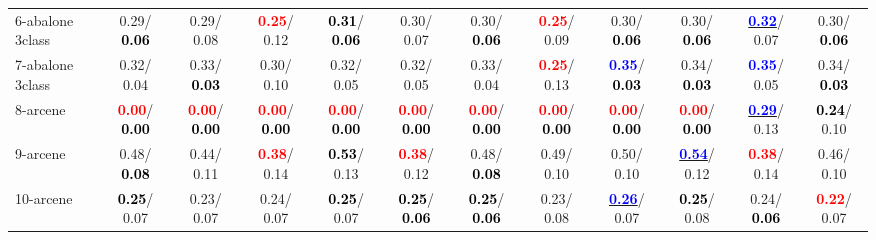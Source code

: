 \begin{table}[h]
\begin{center}
{\begin{tabular}{lc|c|c|c|c|c|c|c|c|c|c}
6-abalone 3class &   0.29/\textcolor{black}{\textbf{  0.06}} &   0.29/  0.08 & \textcolor{red}{\textbf{  0.25}}/  0.12 & \textcolor{black}{\textbf{  0.31}}/\textcolor{black}{\textbf{  0.06}} &   0.30/  0.07 &   0.30/\textcolor{black}{\textbf{  0.06}} & \textcolor{red}{\textbf{  0.25}}/  0.09 &   0.30/\textcolor{black}{\textbf{  0.06}} &   0.30/\textcolor{black}{\textbf{  0.06}} & \underline{\textcolor{blue}{\textbf{  0.32}}}/  0.07 &   0.30/\textcolor{black}{\textbf{  0.06}} \\
7-abalone 3class &   0.32/  0.04 &   0.33/\textcolor{black}{\textbf{  0.03}} &   0.30/  0.10 &   0.32/  0.05 &   0.32/  0.05 &   0.33/  0.04 & \textcolor{red}{\textbf{  0.25}}/  0.13 & \textcolor{blue}{\textbf{  0.35}}/\textcolor{black}{\textbf{  0.03}} &   0.34/\textcolor{black}{\textbf{  0.03}} & \textcolor{blue}{\textbf{  0.35}}/  0.05 &   0.34/\textcolor{black}{\textbf{  0.03}} \\ \hline
8-arcene & \textcolor{red}{\textbf{  0.00}}/\textcolor{black}{\textbf{  0.00}} & \textcolor{red}{\textbf{  0.00}}/\textcolor{black}{\textbf{  0.00}} & \textcolor{red}{\textbf{  0.00}}/\textcolor{black}{\textbf{  0.00}} & \textcolor{red}{\textbf{  0.00}}/\textcolor{black}{\textbf{  0.00}} & \textcolor{red}{\textbf{  0.00}}/\textcolor{black}{\textbf{  0.00}} & \textcolor{red}{\textbf{  0.00}}/\textcolor{black}{\textbf{  0.00}} & \textcolor{red}{\textbf{  0.00}}/\textcolor{black}{\textbf{  0.00}} & \textcolor{red}{\textbf{  0.00}}/\textcolor{black}{\textbf{  0.00}} & \textcolor{red}{\textbf{  0.00}}/\textcolor{black}{\textbf{  0.00}} & \underline{\textcolor{blue}{\textbf{  0.29}}}/  0.13 & \textcolor{black}{\textbf{  0.24}}/  0.10 \\
9-arcene &   0.48/\textcolor{black}{\textbf{  0.08}} &   0.44/  0.11 & \textcolor{red}{\textbf{  0.38}}/  0.14 & \textcolor{black}{\textbf{  0.53}}/  0.13 & \textcolor{red}{\textbf{  0.38}}/  0.12 &   0.48/\textcolor{black}{\textbf{  0.08}} &   0.49/  0.10 &   0.50/  0.10 & \underline{\textcolor{blue}{\textbf{  0.54}}}/  0.12 & \textcolor{red}{\textbf{  0.38}}/  0.14 &   0.46/  0.10 \\
10-arcene & \textcolor{black}{\textbf{  0.25}}/  0.07 &   0.23/  0.07 &   0.24/  0.07 & \textcolor{black}{\textbf{  0.25}}/  0.07 & \textcolor{black}{\textbf{  0.25}}/\textcolor{black}{\textbf{  0.06}} & \textcolor{black}{\textbf{  0.25}}/\textcolor{black}{\textbf{  0.06}} &   0.23/  0.08 & \underline{\textcolor{blue}{\textbf{  0.26}}}/  0.07 & \textcolor{black}{\textbf{  0.25}}/  0.08 &   0.24/\textcolor{black}{\textbf{  0.06}} & \textcolor{red}{\textbf{  0.22}}/  0.07 \\

\end{tabular}}
\end{center}
\end{table}
